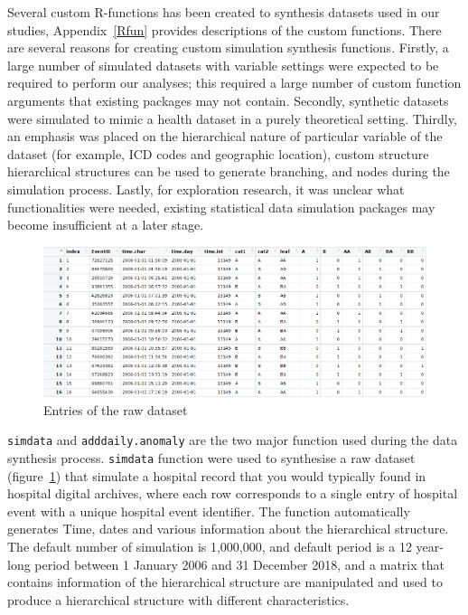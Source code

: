 Several custom R-functions has been created to synthesis datasets used in our studies,  Appendix~\ref{Rfun} provides descriptions of the custom functions. There are several reasons for creating custom simulation synthesis functions. Firstly, a large number of simulated datasets with variable settings were expected to be required to perform our analyses; this required a large number of custom function arguments that existing packages may not contain. Secondly, synthetic datasets were simulated to mimic a health dataset in a purely theoretical setting. Thirdly, an emphasis was placed on the hierarchical nature of particular variable of the dataset (for example, ICD codes and geographic location), custom structure hierarchical structures can be used to generate branching, and nodes during the simulation process. Lastly, for exploration research, it was unclear what functionalities were needed, existing statistical data simulation packages may become insufficient at a later stage.

\begin{figure}[!t]
	\centering
	\includegraphics[width=1.0\linewidth]{Figures/rawdata}
	\caption{Entries of the raw dataset}
	\label{fig:rawdata}
\end{figure}

\newpara

\texttt{simdata} and \texttt{adddaily.anomaly} are the two major function used during the data synthesis process. \texttt{simdata} function were used to synthesise a raw dataset (figure~\ref{fig:rawdata}) that simulate a hospital record that you would typically found in hospital digital archives, where each row corresponds to a single entry of hospital event with a unique hospital event identifier. The function automatically generates Time, dates and various information about the hierarchical structure. The default number of simulation is 1,000,000, and default period is a 12 year-long period between 1 January 2006 and 31 December 2018, and a matrix that contains information of the hierarchical structure are manipulated and used to produce a hierarchical structure with different characteristics.

